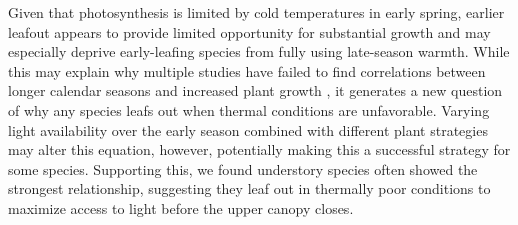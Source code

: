 \documentclass{article}[12pt]
\begin{document}

%
%

Given that photosynthesis is limited by cold temperatures in early spring, earlier leafout appears to provide limited opportunity for substantial growth and may especially deprive early-leafing species from fully using late-season warmth. While this may explain why multiple studies have failed to find correlations between longer calendar seasons and increased plant growth \citep{dow2022warm,silvestro2023longer}, it generates a new question of why any species leafs out when thermal conditions are unfavorable. 
Varying light availability over the early season combined with different plant strategies may alter this equation, however, potentially making this a successful strategy for some species. Supporting this, we found understory species often showed the strongest relationship, suggesting they leaf out in thermally poor conditions to maximize access to light before the upper canopy closes. 
\end{document}

